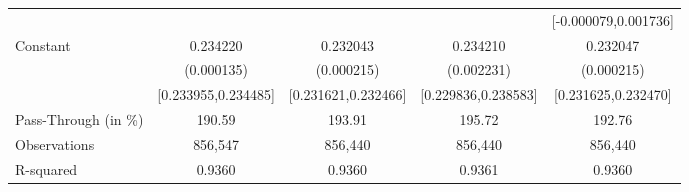 {\begin{tabular}{l*{4}{c}}
                    &                     &                     &                     &[-0.000079,0.001736]         \\
Constant            &    0.234220\sym{***}&    0.232043\sym{***}&    0.234210\sym{***}&    0.232047\sym{***}\\
                    &  (0.000135)         &  (0.000215)         &  (0.002231)         &  (0.000215)         \\
                    &[0.233955,0.234485]         &[0.231621,0.232466]         &[0.229836,0.238583]         &[0.231625,0.232470]         \\
\midrule
Pass-Through (in \%)&      190.59         &      193.91         &      195.72         &      192.76         \\
Observations        &     856,547         &     856,440         &     856,440         &     856,440         \\
R-squared           &      0.9360         &      0.9360         &      0.9361         &      0.9360         \\
\bottomrule
\end{tabular}
}
